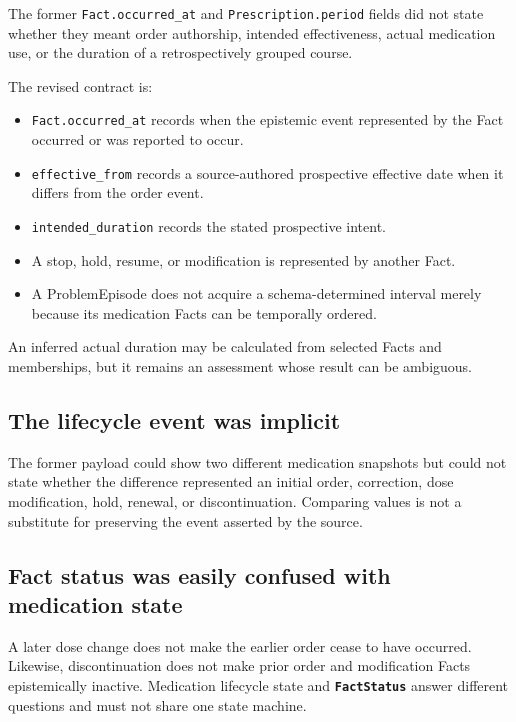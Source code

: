 \documentclass[11pt]{article}
\newcommand{\entity}[1]{\texttt{\textbf{#1}}}
\newcommand{\field}[1]{\texttt{#1}}
\begin{document}
The former \field{Fact.occurred\_at} and
\field{Prescription.period} fields did not state whether they meant order
authorship, intended effectiveness, actual medication use, or the duration of
a retrospectively grouped course.

The revised contract is:

\begin{itemize}[noitemsep]
  \item \field{Fact.occurred\_at} records when the epistemic event represented
    by the Fact occurred or was reported to occur.
  \item \field{effective\_from} records a source-authored prospective
    effective date when it differs from the order event.
  \item \field{intended\_duration} records the stated prospective intent.
  \item A stop, hold, resume, or modification is represented by another Fact.
  \item A ProblemEpisode does not acquire a schema-determined interval merely
    because its medication Facts can be temporally ordered.
\end{itemize}

An inferred actual duration may be calculated from selected Facts and
memberships, but it remains an assessment whose result can be ambiguous.

\subsection{The lifecycle event was implicit}

The former payload could show two different medication snapshots but could
not state whether the difference represented an initial order, correction,
dose modification, hold, renewal, or discontinuation. Comparing values is not
a substitute for preserving the event asserted by the source.

\subsection{Fact status was easily confused with medication state}

A later dose change does not make the earlier order cease to have occurred.
Likewise, discontinuation does not make prior order and modification Facts
epistemically inactive. Medication lifecycle state and \entity{FactStatus}
answer different questions and must not share one state machine.
\end{document}
